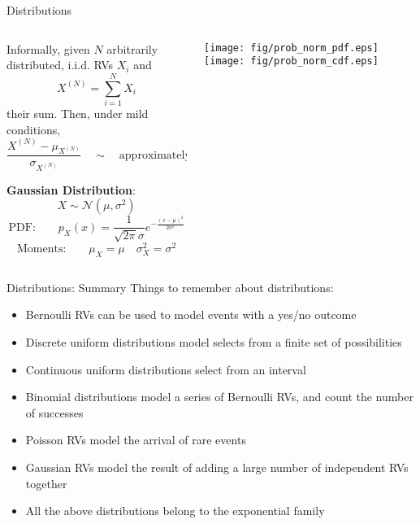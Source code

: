 {\begin{frame}{Distributions}
\begin{columns}[onlytextwidth]
\begin{column}{0.55\textwidth}
                Informally, given $N$ arbitrarily distributed, i.i.d. RVs $X_i$ and
                $$
                    X^{(N)} = \sum_{i=1}^N X_i
                $$
                their sum. Then, under mild conditions,
                $$
                    \frac{X^{(N)} - \mu_{X^{(N)}}}{\sigma_{X^{(N)}}} \quad \sim \quad \text{approximately Gaussian}
                $$

                \begin{boxed}
                    \textbf{Gaussian Distribution}:
                    $$X \sim \mathcal{N}(\mu, \sigma^2)$$
                    \vspace*{-2mm}
                    $$\text{PDF:}\qquad p_X(x) = \frac{1}{\sqrt{2\pi}\sigma}e^{-\frac{(x-\mu)^2}{2\sigma^2}}$$
                    $$\text{Moments:}\qquad \displaystyle \mu_X = \mu \quad \sigma_X^2 = \sigma^2$$
                \end{boxed}

            \end{column}
            \begin{column}{0.45\textwidth}
                \begin{center}
                    \texttt{[image: fig/prob\_norm\_pdf.eps]}
                    \qquad
                    \texttt{[image: fig/prob\_norm\_cdf.eps]}
                \end{center}

            \end{column}
        \end{columns}
    \end{frame}


    \begin{frame}{Distributions: Summary}
        Things to remember about distributions:
        \begin{itemize}
            \item Bernoulli RVs can be used to model events with a yes/no outcome
            \item Discrete uniform distributions model selects from a finite set of possibilities
            \item Continuous uniform distributions select from an interval
            \item Binomial distributions model a series of Bernoulli RVs, and count the number of successes
            \item Poisson RVs model the arrival of rare events
            \item Gaussian RVs model the result of adding a large number of independent RVs together
            \item All the above distributions belong to the exponential family
        \end{itemize}
    \end{frame}

}
